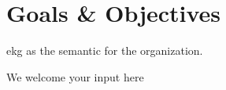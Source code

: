 \section{Goals \& Objectives}\label{sec:ekg-mm-b-1-1} %

\gls{ekg} as the semantic  for the organization.

We welcome your input here
